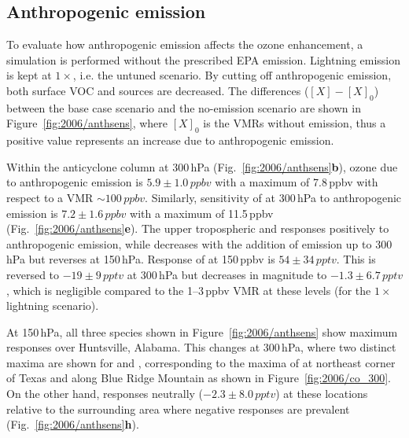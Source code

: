 \subsection{Anthropogenic emission}\label{ssec:2006/sens/anthrop}

To evaluate how anthropogenic emission affects the ozone enhancement, a simulation is performed without the prescribed
EPA emission. Lightning emission is kept at $1\times$, i.e. the untuned scenario. By cutting off anthropogenic emission, both
surface VOC and  sources are decreased. The differences ($[X]-[X]_0$) between the base case scenario and
the no-emission scenario are shown in Figure~\ref{fig:2006/anthsens}, where $[X]_0$ is the VMRs without emission, thus
a positive value represents an increase due to anthropogenic emission.


Within the anticyclone column at 300\,\unit{hPa} (Fig.~\ref{fig:2006/anthsens}{\bf b}), ozone due to anthropogenic emission
is $5.9\pm1.0\,\unit{ppbv}$ with a maximum of 7.8\,\unit{ppbv} with respect to a VMR $\sim100\,\unit{ppbv}$. Similarly,
sensitivity of  at 300\,\unit{hPa} to anthropogenic emission is $7.2\pm1.6\,\unit{ppbv}$ with a maximum of
11.5\,\unit{ppbv} (Fig.~\ref{fig:2006/anthsens}{\bf e}). The upper tropospheric  and  responses
positively to anthropogenic emission, while  decreases with the addition of emission up to 300\,\unit{hPa}
but reverses at 150\,\unit{hPa}. Response of  at 150\,\unit{ppbv} is $54\pm34\,\unit{pptv}$. This is reversed
to $-19\pm9\,\unit{pptv}$ at 300\,\unit{hPa} but decreases in magnitude to $-1.3\pm6.7\,\unit{pptv}$, which is negligible
compared to the 1--3\,\unit{ppbv} VMR at these levels (for the $1\times$ lightning scenario).

At 150\,\unit{hPa}, all three species shown in Figure~\ref{fig:2006/anthsens} show maximum responses over Huntsville,
Alabama. This changes at 300\,\unit{hPa}, where two distinct maxima are shown for  and ,
corresponding to the maxima of  at northeast corner of Texas and along Blue Ridge Mountain as shown in
Figure~\ref{fig:2006/co_300}. On the other hand,  responses neutrally ($-2.3\pm8.0\,\unit{pptv}$) at
these locations relative to the surrounding area where negative responses are prevalent (Fig.~\ref{fig:2006/anthsens}{\bf h}).

